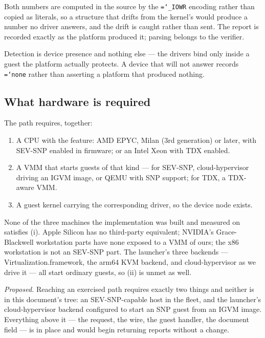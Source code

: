 \documentclass[11pt,a4paper]{article}
\newcommand{\code}[1]{\texttt{\hyphenchar\font=`\-\relax #1}}
\begin{document}
Both numbers are computed in the source by the \code{\_IOWR} encoding rather than
copied as literals, so a structure that drifts from the kernel's would produce a
number no driver answers, and the drift is caught rather than sent. The report is
recorded exactly as the platform produced it; parsing belongs to the verifier.

Detection is device presence and nothing else --- the drivers bind only inside a
guest the platform actually protects. A device that will not answer records
\code{none} rather than asserting a platform that produced nothing.

\subsection{What hardware is required}
\label{sec:hw}

The path requires, together:

\begin{enumerate}[label=(\roman*)]
\item A CPU with the feature: AMD EPYC, Milan (3rd generation) or later, with
  SEV-SNP enabled in firmware; or an Intel Xeon with TDX enabled.
\item A VMM that starts guests of that kind --- for SEV-SNP, cloud-hypervisor
  driving an IGVM image, or QEMU with SNP support; for TDX, a TDX-aware VMM.
\item A guest kernel carrying the corresponding driver, so the device node exists.
\end{enumerate}

None of the three machines the implementation was built and measured on satisfies
(i). Apple Silicon has no third-party equivalent; NVIDIA's Grace-Blackwell
workstation parts have none exposed to a VMM of ours; the x86 workstation is not
an SEV-SNP part. The launcher's three backends --- Virtualization.framework, the
arm64 KVM backend, and cloud-hypervisor as we drive it --- all start ordinary
guests, so (ii) is unmet as well.

\emph{Proposed.} Reaching an exercised path requires exactly two things and
neither is in this document's tree: an SEV-SNP-capable host in the fleet, and the
launcher's cloud-hypervisor backend configured to start an SNP guest from an IGVM
image. Everything above it --- the request, the wire, the guest handler, the
document field --- is in place and would begin returning reports without a change.

\end{document}
